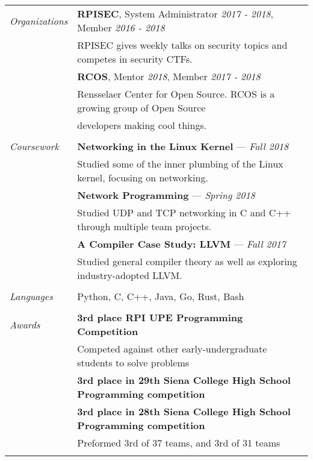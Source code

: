 \documentclass[letterpaper,10pt,oneside]{article}
\newcommand\entrytitle[1]{{\addfontfeature{LetterSpace=2}\textbf{#1}}}
\begin{document}
\begin{tabular}{@{} l l}
  \textit{Organizations}
  & \entrytitle{RPISEC}, System Administrator \textit{2017 - 2018}, Member \textit{2016 - 2018} \\
  & RPISEC gives weekly talks on security topics and competes in security CTFs. \\
  & \entrytitle{RCOS}, Mentor \textit{2018}, Member \textit{2017 - 2018} \\
  & Rensselaer Center for Open Source. RCOS is a growing group of Open Source \\
  & developers making cool things. \\
  & \\

  \textit{Coursework}
  & \entrytitle{Networking in the Linux Kernel} --- \textit{Fall 2018} \\
  & Studied some of the inner plumbing of the Linux kernel, focusing on networking. \\
  & \entrytitle{Network Programming} --- \textit{Spring 2018} \\
  & Studied UDP and TCP networking in C and C++ through multiple team projects. \\
  & \entrytitle{A Compiler Case Study: LLVM} --- \textit{Fall 2017} \\
  & Studied general compiler theory as well as exploring industry-adopted LLVM. \\
  & \\

  \textit{Languages}
  & Python, C, C++, Java, Go, Rust, Bash \\
  & \\

  \textit{Awards}
  & \entrytitle{3rd place RPI UPE Programming Competition} \\
  & Competed against other early-undergraduate students to solve problems \\
  & \entrytitle{3rd place in 29th Siena College High School Programming competition} \\
  & \entrytitle{3rd place in 28th Siena College High School Programming competition} \\
  & Preformed 3rd of 37 teams, and 3rd of 31 teams \\
  & \\

\end{tabular}
\end{document}
